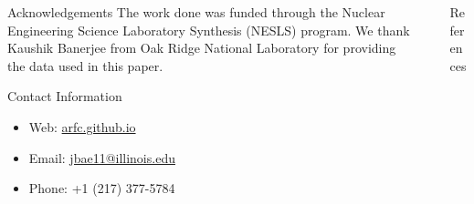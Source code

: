 \documentclass[final]{beamer}
\newlength{\sepwid}
\newlength{\onecolwid}
\newlength{\threecolwid}
\begin{document}
\begin{frame}[t]
\begin{columns}[t,totalwidth=\threecolwid]
\begin{column}{\onecolwid}


\begin{block}{Acknowledgements}
The work done was funded through the Nuclear Engineering Science
Laboratory Synthesis (NESLS) program. We thank Kaushik Banerjee
from Oak Ridge National Laboratory for providing the data used
in this paper. 

\end{block}





\begin{alertblock}{Contact Information}
\begin{itemize}
    
    \item Web: \href{arfc.github.io}{arfc.github.io}
    \item Email: \href{mailto:jbae11@illinois.edu}{jbae11@illinois.edu}
    \item Phone: +1 (217) 377-5784
\end{itemize}

\end{alertblock}


\end{column} %

\begin{column}{\sepwid}\end{column} %

\begin{column}{\onecolwid} %


\begin{block}{References}


\end{block}
\end{column}
\end{columns}
\end{frame}
\end{document}
